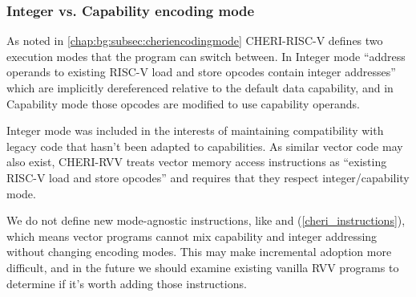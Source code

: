 \subsubsection{Integer vs. Capability encoding mode\label{chap:emu:rvv_int_mode}}
As noted in \cref{chap:bg:subsec:cheriencodingmode} CHERI-RISC-V defines two execution modes that the program can switch between.
In Integer mode \enquote{address operands to existing RISC-V load and store opcodes contain integer addresses} which are implicitly dereferenced relative to the default data capability, and in Capability mode those opcodes are modified to use capability operands.

Integer mode was included in the interests of maintaining compatibility with legacy code that hasn't been adapted to capabilities.
As similar vector code may also exist, CHERI-RVV treats vector memory access instructions as \enquote{existing RISC-V load and store opcodes} and requires that they respect integer/capability mode.

We do not define new mode-agnostic instructions, like  and  (\cref{cheri_instructions}), which means vector programs cannot mix capability and integer addressing without changing encoding modes.
This may make incremental adoption more difficult, and in the future we should examine existing vanilla RVV programs to determine if it's worth adding those instructions.
